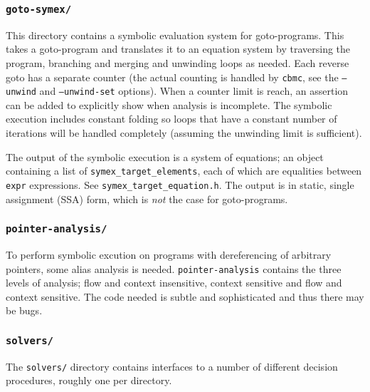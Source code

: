 \documentclass{article}
\newcommand{\dir}[1]{\texttt{#1}}
\newcommand{\file}[1]{\texttt{#1}}
\newcommand{\code}[1]{\texttt{#1}}
\newcommand{\prog}[1]{\texttt{#1}}
\begin{document}
\subsubsection{\dir{goto-symex/}}

This directory contains a symbolic evaluation system for
goto-programs.  This takes a goto-program and translates it to an
equation system by traversing the program, branching and merging and
unwinding loops as needed.  Each reverse goto has a separate counter
(the actual counting is handled by \prog{cbmc}, see the \code{--unwind}
and \code{--unwind-set} options).  When a counter limit
is reach, an assertion can be added to explicitly show when analysis
is incomplete.  The symbolic execution includes constant folding so
loops that have a constant number of iterations will be handled
completely (assuming the unwinding limit is sufficient).

The output of the symbolic execution is a system of equations; an
object containing a list of \code{symex\_target\_elements}, each of
which are equalities between \prog{expr} expressions.  See
\file{symex\_target\_equation.h}.  The output is in static, single
assignment (SSA) form, which is \emph{not} the case for goto-programs.



\subsubsection{\dir{pointer-analysis/}}

To perform symbolic excution on programs with dereferencing of
arbitrary pointers, some alias analysis is needed.
\dir{pointer-analysis} contains the three levels of analysis; flow and
context insensitive, context sensitive and flow and context
sensitive.  The code needed is subtle and sophisticated and thus there
may be bugs.




\subsubsection{\dir{solvers/}}

The \dir{solvers/} directory contains interfaces to a number of
different decision procedures, roughly one per directory.  
\end{document}

